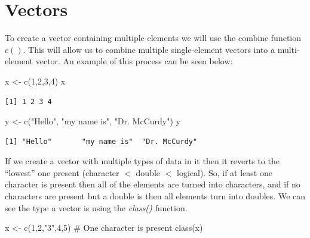 \documentclass[
  letterpaper,
  DIV=11,
  numbers=noendperiod]{scrreprt}
\newenvironment{Shaded}{\begin{snugshade}}{\end{snugshade}}
\newcommand{\CommentTok}[1]{\textcolor[rgb]{0.37,0.37,0.37}{#1}}
\newcommand{\DecValTok}[1]{\textcolor[rgb]{0.68,0.00,0.00}{#1}}
\newcommand{\FunctionTok}[1]{\textcolor[rgb]{0.28,0.35,0.67}{#1}}
\newcommand{\NormalTok}[1]{\textcolor[rgb]{0.00,0.23,0.31}{#1}}
\newcommand{\OtherTok}[1]{\textcolor[rgb]{0.00,0.23,0.31}{#1}}
\newcommand{\StringTok}[1]{\textcolor[rgb]{0.13,0.47,0.30}{#1}}
\begin{document}
\section{Vectors}\label{vectors}

To create a vector containing multiple elements we will use the combine
function \(c()\). This will allow us to combine multiple single-element
vectors into a multi-element vector. An example of this process can be
seen below:

\begin{Shaded}
\begin{Highlighting}[]
\NormalTok{x }\OtherTok{\textless{}{-}} \FunctionTok{c}\NormalTok{(}\DecValTok{1}\NormalTok{,}\DecValTok{2}\NormalTok{,}\DecValTok{3}\NormalTok{,}\DecValTok{4}\NormalTok{)}
\NormalTok{x}
\end{Highlighting}
\end{Shaded}

\begin{verbatim}
[1] 1 2 3 4
\end{verbatim}

\begin{Shaded}
\begin{Highlighting}[]
\NormalTok{y }\OtherTok{\textless{}{-}} \FunctionTok{c}\NormalTok{(}\StringTok{"Hello"}\NormalTok{, }\StringTok{"my name is"}\NormalTok{, }\StringTok{"Dr. McCurdy"}\NormalTok{)}
\NormalTok{y}
\end{Highlighting}
\end{Shaded}

\begin{verbatim}
[1] "Hello"       "my name is"  "Dr. McCurdy"
\end{verbatim}

If we create a vector with multiple types of data in it then it reverts
to the ``lowest'' one present (character \(<\) double \(<\) logical).
So, if at least one character is present then all of the elements are
turned into characters, and if no characters are present but a double is
then all elements turn into doubles. We can see the type a vector is
using the \emph{class()} function.

\begin{Shaded}
\begin{Highlighting}[]
\NormalTok{x }\OtherTok{\textless{}{-}} \FunctionTok{c}\NormalTok{(}\DecValTok{1}\NormalTok{,}\DecValTok{2}\NormalTok{,}\StringTok{"3"}\NormalTok{,}\DecValTok{4}\NormalTok{,}\DecValTok{5}\NormalTok{) }\CommentTok{\# One character is present}
\FunctionTok{class}\NormalTok{(x)}
\end{Highlighting}
\end{Shaded}
\end{document}
